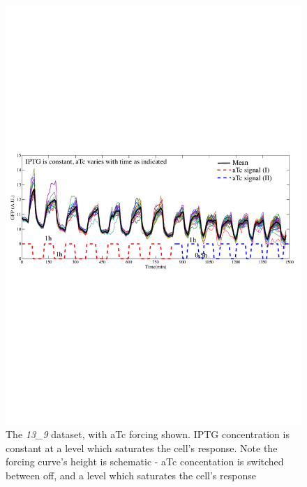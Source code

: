 \documentclass[10pt,journal]{./IEEE_latex_class/IEEEtran}
\begin{document}
\begin{figure}[h]
\centering
\includegraphics[trim = 0 310 0 300 , scale = 0.7, clip = true]{13_9}
\caption{The \textit{13\_9} dataset, with aTc forcing shown. IPTG concentration is constant at a level which saturates the cell's response. Note the forcing curve's height is schematic - aTc concentation is switched between off, and a level which saturates the cell's response}
\label{}
\end{figure}
\end{document}
